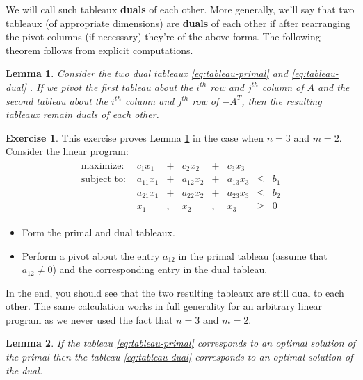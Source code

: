 \documentclass[
]{book}
\providecommand{\tightlist}{%
  \setlength{\itemsep}{0pt}\setlength{\parskip}{0pt}}
\newtheorem{lemma}{Lemma}[chapter]
\theoremstyle{definition}
\theoremstyle{definition}
\theoremstyle{definition}
\newtheorem{exercise}{Exercise}[chapter]
\theoremstyle{definition}
\theoremstyle{remark}
\begin{document}
We will call such tableaux \textbf{duals} of each other. More generally, we'll say that two tableaux (of
appropriate dimensions) are \textbf{duals} of each other if after rearranging the pivot columns (if
necessary) they're of the above forms. The following theorem follows from explicit computations.

\begin{lemma}
\protect\hypertarget{lem:pivot}{}\label{lem:pivot}Consider the two dual tableaux \eqref{eq:tableau-primal} and \eqref{eq:tableau-dual} .
If we pivot the first tableau about the \(i^{th}\) row and \(j^{th}\) column of \(A\) and the second tableau about the \(i^{th}\) column and \(j^{th}\) row of \(-A^T\), then the resulting tableaux remain duals of each other.
\end{lemma}

\begin{exercise}
This exercise proves Lemma \ref{lem:pivot} in the case when \(n = 3\) and \(m = 2\). Consider the
linear program:
\begin{align*}
  \begin{array}{rrrrrrrrrrr}
    \mbox{maximize: } & c_1 x_1 & + & c_2 x_2 & + & c_3 x_3 \\
    \mbox{subject to: } 
    & a_{11} x_1 & + & a_{12} x_2 & + & a_{13} x_3 & \le & b_1 \\
    & a_{21} x_1 & + & a_{22} x_2 & + & a_{23} x_3 & \le & b_2 \\
    & x_1 & , & x_2 & , & x_3 & \ge & 0
  \end{array}
\end{align*}

\begin{itemize}
\tightlist
\item
  Form the primal and dual tableaux.
\item
  Perform a pivot about the entry \(a_{12}\) in the primal tableau (assume that \(a_{12} \neq 0\)) and
  the corresponding entry in the dual tableau.
\end{itemize}

In the end, you should see that the two resulting tableaux are still dual to each other. The same
calculation works in full generality for an arbitrary linear program as we never used the fact that
\(n = 3\) and \(m = 2\).
\end{exercise}

\begin{lemma}
\protect\hypertarget{lem:optimality}{}\label{lem:optimality}If the tableau \eqref{eq:tableau-primal} corresponds to an optimal solution of the primal then the tableau \eqref{eq:tableau-dual} corresponds to an optimal solution of the dual.
\end{lemma}
\end{document}
